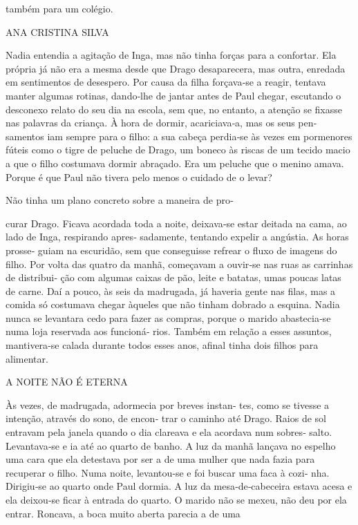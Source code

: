também para um colégio.

ANA CRISTINA SILVA

Nadia entendia a agitação de Inga, mas não tinha forças para a
confortar. Ela própria já não era a mesma desde que Drago desaparecera,
mas outra, enredada em sentimentos de desespero. Por causa da filha
forçava‑se a reagir, tentava manter algumas rotinas, dando‑lhe de jantar
antes de Paul chegar, escutando o desconexo relato do seu dia na escola,
sem que, no entanto, a atenção se fixasse nas palavras da criança. À
hora de dormir, acariciava‑a, mas os seus pen‑ samentos iam sempre para
o filho: a sua cabeça perdia‑se às vezes em pormenores fúteis como o
tigre de peluche de Drago, um boneco às riscas de um tecido macio a que
o filho costumava dormir abraçado. Era um peluche que o menino amava.
Porque é que Paul não tivera pelo menos o cuidado de o levar?

Não tinha um plano concreto sobre a maneira de pro‑

curar Drago. Ficava acordada toda a noite, deixava‑se estar deitada na
cama, ao lado de Inga, respirando apres‑ sadamente, tentando expelir a
angústia. As horas prosse‑ guiam na escuridão, sem que conseguisse
refrear o fluxo de imagens do filho. Por volta das quatro da manhã,
começavam a ouvir‑se nas ruas as carrinhas de distribui‑ ção com algumas
caixas de pão, leite e batatas, umas poucas latas de carne. Daí a pouco,
às seis da madrugada, já haveria gente nas filas, mas a comida só
costumava chegar àqueles que não tinham dobrado a esquina. Nadia nunca
se levantara cedo para fazer as compras, porque o marido abastecia‑se
numa loja reservada aos funcioná‑ rios. Também em relação a esses
assuntos, mantivera‑se calada durante todos esses anos, afinal tinha
dois filhos para alimentar.

A NOITE NÃO É ETERNA

Às vezes, de madrugada, adormecia por breves instan‑ tes, como se
tivesse a intenção, através do sono, de encon‑ trar o caminho até Drago.
Raios de sol entravam pela janela quando o dia clareava e ela acordava
num sobres‑ salto. Levantava‑se e ia até ao quarto de banho. A luz da
manhã lançava no espelho uma cara que ela detestava por ser a de uma
mulher que nada fazia para recuperar o filho. Numa noite, levantou‑se e
foi buscar uma faca à cozi‑ nha. Dirigiu‑se ao quarto onde Paul dormia.
A luz da mesa‑de‑cabeceira estava acesa e ela deixou‑se ficar à entrada
do quarto. O marido não se mexeu, não deu por ela entrar. Roncava, a
boca muito aberta parecia a de uma

